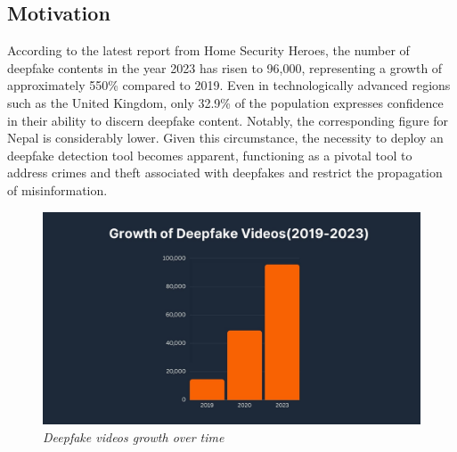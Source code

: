 \subsection{Motivation}
According to the latest report from Home Security Heroes, the number of deepfake contents in the year 2023 has risen to 96,000, representing a growth of approximately 550\% compared to 2019. Even in technologically advanced regions such as the United Kingdom, only 32.9\% of the population expresses confidence in their ability to discern deepfake content. Notably, the corresponding figure for Nepal is considerably lower. Given this circumstance, the necessity to deploy an deepfake detection tool becomes apparent, functioning as a pivotal tool to address crimes and theft associated with deepfakes and  restrict the propagation of misinformation.\\
\begin{figure}[h]
    \centering
    \includegraphics[width= 5.5in ]{img/deepfake-videos-growth.jpg}
    \caption{\textit{Deepfake videos growth over time}}
\end{figure}
\newpage